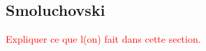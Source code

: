 \documentclass[11pt,a4paper]{article}
\newcommand{\RRP}{\mathbb{R}^+_*}
\newcommand{\MC}{\mathcal{M}}
\newcommand{\red}[1]{\textcolor{red}{#1}}
\newcommand{\Proc}[1]{\left(#1\right)_{t\geq 0}}
\newcommand{\brac}[1]{\left\langle#1\right\rangle}
\newcommand{\dd}{\mathop{}\!\mathrm{d}}
\begin{document}
\subsection{Smoluchovski}
\red{Expliquer ce que l(on) fait dans cette section.
}
\end{document}
